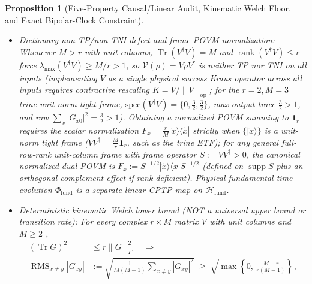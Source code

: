 \documentclass[11pt,a4paper]{article}
\newtheorem{proposition}{Proposition}
\theoremstyle{definition}
\theoremstyle{remark}
\newcommand{\Tr}{\operatorname{Tr}}
\newcommand{\rank}{\operatorname{rank}}
\newcommand{\supp}{\operatorname{supp}}
\newcommand{\RMS}{\operatorname{RMS}}
\newcommand{\cH}{\mathcal{H}}
\newcommand{\1}{\mathbf{1}}
\newcommand{\normF}[1]{\|#1\|_F}
\newcommand{\normOp}[1]{\|#1\|_{\mathrm{op}}}
\begin{document}
\begin{proposition}[Five-Property Causal/Linear Audit, Kinematic Welch Floor, and Exact Bipolar-Clock Constraint]
\begin{enumerate}
\begin{itemize}
    \item \emph{Dictionary non-TP/non-TNI defect and frame-POVM normalization:} Whenever $M>r$ with unit columns, $\Tr(V^\dagger V)=M$ and $\rank(V^\dagger V)\le r$ force $\lambda_{\max}(V^\dagger V)\ge M/r > 1$, so $\mathcal{V}(\rho)=V\rho V^\dagger$ is \emph{neither TP nor TNI} on all inputs (implementing $V$ as a single physical success Kraus operator across all inputs requires contractive rescaling $K=V/\normOp{V}$; for the $r=2,M=3$ trine unit-norm tight frame, $\mathrm{spec}(V^\dagger V)=\{0,\frac{3}{2},\frac{3}{2}\}$, max output trace $\frac{3}{2}>1$, and raw $\sum_x|G_{x0}|^2=\frac{3}{2}>1$). Obtaining a normalized POVM summing to $\1_r$ requires the scalar normalization $F_x=\frac{r}{M}|\tilde{x}\rangle\langle\tilde{x}|$ strictly when $\{|\tilde{x}\rangle\}$ is a \emph{unit-norm tight frame} ($VV^\dagger=\frac{M}{r}\1_r$, such as the trine ETF); for any general full-row-rank unit-column frame with frame operator $S:=VV^\dagger>0$, the canonical normalized dual POVM is $F_x:=S^{-1/2}|\tilde{x}\rangle\langle\tilde{x}|S^{-1/2}$ (defined on $\supp S$ plus an orthogonal-complement effect if rank-deficient). Physical fundamental time evolution $\Phi_{\mathrm{fund}}$ is a separate linear CPTP map on $\cH_{\mathrm{fund}}$.
    \item \emph{Deterministic kinematic Welch lower bound (NOT a universal upper bound or transition rate):} For every complex $r\times M$ matrix $V$ with unit columns and $M\ge 2$ \cite{Welch1974},
    \begin{equation}\label{eq:welch-floor}
      \begin{aligned}
        (\Tr G)^2 &\le r\normF{G}^2 \quad\Longrightarrow\\
        \RMS_{x\neq y}|G_{xy}|
        &:= \sqrt{\frac{1}{M(M-1)}\sum_{x\neq y}|G_{xy}|^2}
        \;\ge\; \sqrt{\max\!\left\{0,\,\frac{M-r}{r(M-1)}\right\}},
      \end{aligned}
    \end{equation}

\end{itemize}
\end{enumerate}
\end{proposition}
\end{document}
